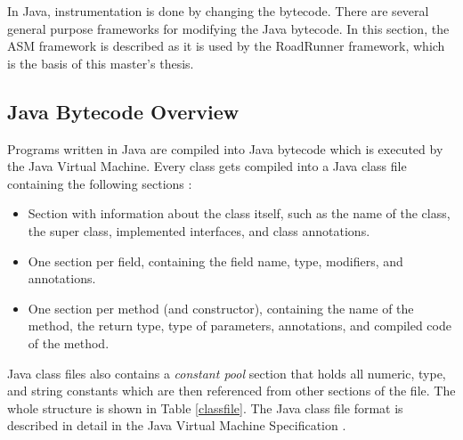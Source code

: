 In Java, instrumentation is done by changing the bytecode. There are several
general purpose frameworks for modifying the Java bytecode. In this section, the
ASM framework is described as it is used by the RoadRunner framework, which is
the basis of this master's thesis.

\subsection{Java Bytecode Overview}

Programs written in Java are compiled into Java bytecode which is executed by
the Java Virtual Machine. Every class gets compiled into a Java class file
containing the following sections \cite{asmguide}:
\begin{itemize}
    \item Section with information about the class itself, such as the name of
    the class, the super class, implemented interfaces, and class annotations.
    \item One section per field, containing the field name, type, modifiers, and
    annotations.
    \item One section per method (and constructor), containing the name of the
    method, the return type, type of parameters, annotations, and compiled code
    of the method.
\end{itemize}

Java class files also contains a \emph{constant pool} section that holds all
numeric, type, and string constants which are then referenced from other
sections of the file. The whole structure is shown in Table \ref{classfile}.
The Java class file format is described in detail in the Java Virtual Machine
Specification \cite{jvmspec}.


